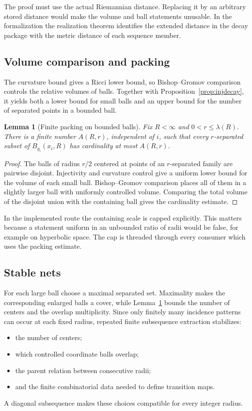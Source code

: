 \documentclass[11pt]{article}
\theoremstyle{plain}
\newtheorem{lemma}[theorem]{Lemma}
\theoremstyle{definition}
\theoremstyle{remark}
\begin{document}
The proof must use the actual Riemannian distance.  Replacing it by an
arbitrary stored distance would make the volume and ball statements
unusable.  In the formalization the realization theorem identifies the
extended distance in the decay package with the metric distance of each
sequence member.

\subsection{Volume comparison and packing}

The curvature bound gives a Ricci lower bound, so Bishop--Gromov comparison
controls the relative volumes of balls.  Together with
Proposition~\ref{prop:injdecay}, it yields both a lower bound for small balls
and an upper bound for the number of separated points in a bounded ball.

\begin{lemma}[Finite packing on bounded balls]\label{lem:packing}
Fix \(R<\infty\) and \(0<r\leq\lambda(R)\).  There is a finite number
\(A(R,r)\), independent of \(i\), such that every \(r\)-separated subset of
\(B_{g_i}(x_i,R)\) has cardinality at most \(A(R,r)\).
\end{lemma}

\begin{proof}
The balls of radius \(r/2\) centered at points of an \(r\)-separated family
are pairwise disjoint.  Injectivity and curvature control give a uniform
lower bound for the volume of each small ball.  Bishop--Gromov comparison
places all of them in a slightly larger ball with uniformly controlled
volume.  Comparing the total volume of the disjoint union with the containing
ball gives the cardinality estimate.
\end{proof}

In the implemented route the containing scale is capped explicitly.  This
matters because a statement uniform in an unbounded ratio of radii would be
false, for example on hyperbolic space.  The cap is threaded through every
consumer which uses the packing estimate.

\subsection{Stable nets}

For each large ball choose a maximal separated set.  Maximality makes the
corresponding enlarged balls a cover, while Lemma~\ref{lem:packing} bounds the
number of centers and the overlap multiplicity.  Since only finitely many
incidence patterns can occur at each fixed radius, repeated finite
subsequence extraction stabilizes:
\begin{itemize}[leftmargin=2em]
  \item the number of centers;
  \item which controlled coordinate balls overlap;
  \item the parent relation between consecutive radii;
  \item and the finite combinatorial data needed to define transition maps.
\end{itemize}
A diagonal subsequence makes these choices compatible for every integer
radius.
\end{document}

